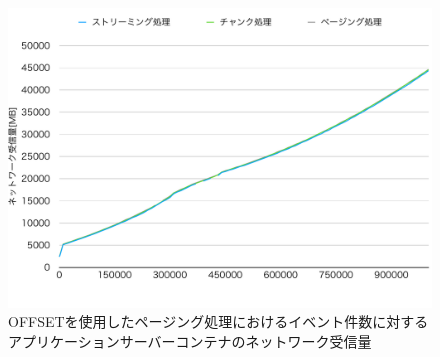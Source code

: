 \documentclass[../../../../../main]{subfiles}
\begin{document}
    \begin{figure}[H]
        \centering
        \includegraphics[width=12cm]{graph}
        \caption{OFFSETを使用したページング処理におけるイベント件数に対するアプリケーションサーバーコンテナのネットワーク受信量}
        \label{fig:each-way-app-net-in-app_1_1024-db_1_1024}
    \end{figure}
\end{document}
